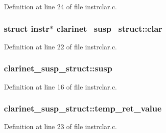 Definition at line 24 of file instrclar.\+c.

\subsubsection[{\texorpdfstring{clar}{clar}}]{\setlength{\rightskip}{0pt plus 5cm}struct {\bf instr}$\ast$ clarinet\+\_\+susp\+\_\+struct\+::clar}\hypertarget{structclarinet__susp__struct_a5bdb4ef924ebde455c055b51e562fd63}{}\label{structclarinet__susp__struct_a5bdb4ef924ebde455c055b51e562fd63}


Definition at line 22 of file instrclar.\+c.

\subsubsection[{\texorpdfstring{susp}{susp}}]{ clarinet\+\_\+susp\+\_\+struct\+::susp}\hypertarget{structclarinet__susp__struct_a31cef06e4ffcf1e2ac862095d71f9ff8}{}\label{structclarinet__susp__struct_a31cef06e4ffcf1e2ac862095d71f9ff8}


Definition at line 16 of file instrclar.\+c.

\subsubsection[{\texorpdfstring{temp\+\_\+ret\+\_\+value}{temp_ret_value}}]{ clarinet\+\_\+susp\+\_\+struct\+::temp\+\_\+ret\+\_\+value}\hypertarget{structclarinet__susp__struct_a5bcaf90a2ff9baa50b8ad2814f6c70ae}{}\label{structclarinet__susp__struct_a5bcaf90a2ff9baa50b8ad2814f6c70ae}


Definition at line 23 of file instrclar.\+c.

